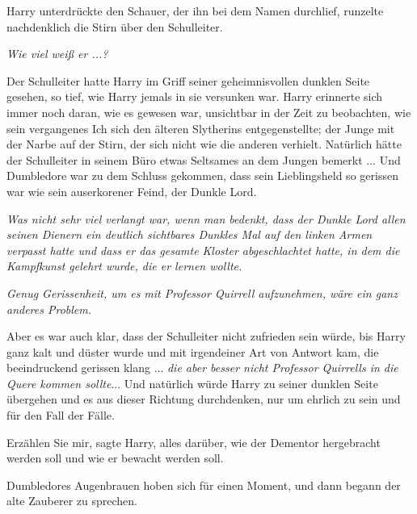 Harry unterdrückte den Schauer, der ihn bei dem Namen durchlief, runzelte
nachdenklich die Stirn über den Schulleiter.

\emph{Wie viel weiß er ...?}

Der Schulleiter hatte Harry im Griff seiner geheimnisvollen dunklen Seite
gesehen, so tief, wie Harry jemals in sie versunken war. Harry erinnerte sich
immer noch daran, wie es gewesen war, unsichtbar in der Zeit zu beobachten, wie
sein vergangenes Ich sich den älteren Slytherins entgegenstellte; der Junge mit
der Narbe auf der Stirn, der sich nicht wie die anderen verhielt. Natürlich
hätte der Schulleiter in seinem Büro etwas Seltsames an dem Jungen bemerkt ...
Und Dumbledore war zu dem Schluss gekommen, dass sein Lieblingsheld so gerissen
war wie sein auserkorener Feind, der Dunkle Lord.

\emph{Was nicht sehr viel verlangt war, wenn man bedenkt, dass der Dunkle Lord
allen seinen Dienern ein deutlich sichtbares Dunkles Mal auf den linken Armen
verpasst hatte und dass er das gesamte Kloster abgeschlachtet hatte, in dem die
Kampfkunst gelehrt wurde, die er lernen wollte.}

\emph{Genug Gerissenheit, um es mit Professor Quirrell aufzunehmen, wäre ein
ganz anderes Problem.}

Aber es war auch klar, dass der Schulleiter nicht zufrieden sein würde, bis
Harry ganz kalt und düster wurde und mit irgendeiner Art von Antwort kam, die
beeindruckend gerissen klang ... \emph{die aber besser nicht Professor Quirrells
in die Quere kommen sollte}... Und natürlich würde Harry zu seiner dunklen Seite
übergehen und es aus dieser Richtung durchdenken, nur um ehrlich zu sein und für
den Fall der Fälle.

\glqq{}Erzählen Sie mir\grqq{}, sagte Harry, \glqq{}alles darüber, wie der
Dementor hergebracht werden soll und wie er bewacht werden soll.\grqq{}

Dumbledores Augenbrauen hoben sich für einen Moment, und dann begann der alte
Zauberer zu sprechen.

